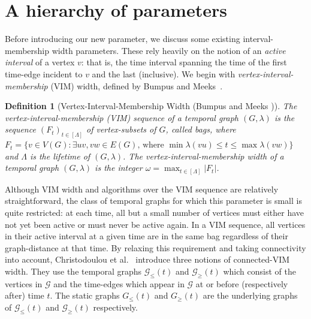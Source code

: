 \documentclass[a4paper,UKenglish,cleveref, autoref, thm-restate]{lipics-v2021} %
\newcounter{ctheorem}
\newtheorem{defn}[ctheorem]{Definition}
\begin{document}
\section{A hierarchy of parameters}\label{sec:comparison}
Before introducing our new parameter, we discuss some existing interval-membership width parameters.
These rely heavily on the notion of an \emph{active interval} of a vertex $v$: that is, the time interval spanning the time of the first time-edge incident to $v$ and the last (inclusive).
We begin with \emph{vertex-interval-membership} (VIM) width, defined by Bumpus and Meeks~\cite{bumpus_edge_2023}.
\begin{defn}[Vertex-Interval-Membership Width (Bumpus and Meeks \cite{bumpus_edge_2023})]
    The vertex-interval-membership (VIM) sequence of a temporal graph $(G, \lambda)$ is the sequence $(F_t)_{t\in[\Lambda]}$ of vertex-subsets of $G$, called \emph{bags}, where $F_t = \{v \in V(G) : \exists uv,vw\in E(G)\text{, where } \min \lambda(vu) \leq t \leq \max \lambda(vw) \}$ and $\Lambda$ is the lifetime of $(G, \lambda)$. The \emph{vertex-interval-membership width} of a temporal graph $(G, \lambda)$ is the integer $\omega = \max_{t \in [\Lambda]}|F_t|$.
\end{defn}

 Although VIM width and algorithms over the VIM sequence are relatively straightforward, the class of temporal graphs for which this parameter is small is quite restricted: at each time, all but a small number of vertices must either have not yet been active or must never be active again. In a VIM sequence, all vertices in their active interval at a given time are in the same bag regardless of their graph-distance at that time. 
 By relaxing this requirement and taking connectivity into account, Christodoulou et al.~\cite{christodoulou_making_2024} introduce three notions of connected-VIM width. They use the temporal graphs $\mathcal{G}_{\leq}(t)$ and $\mathcal{G}_{\geq}(t)$ which consist of the vertices in $\mathcal{G}$ and the time-edges which appear in $\mathcal{G}$ at or before (respectively after) time $t$. The static graphs $G_{\leq}(t)$ and $G_{\geq}(t)$ are the underlying graphs of $\mathcal{G}_{\leq}(t)$ and $\mathcal{G}_{\geq}(t)$ respectively. 
\end{document}
